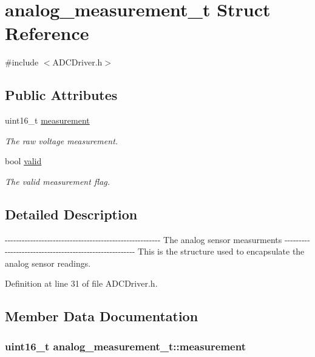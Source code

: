 \hypertarget{structanalog__measurement__t}{\section{analog\-\_\-measurement\-\_\-t \-Struct \-Reference}
\label{structanalog__measurement__t}
}


{\ttfamily \#include $<$\-A\-D\-C\-Driver.\-h$>$}

\subsection*{\-Public \-Attributes}
\begin{DoxyCompactItemize}
\item 
uint16\-\_\-t \hyperlink{structanalog__measurement__t_a57e124bc5340136bbbb95a2f37a6ce09}{measurement}
\begin{DoxyCompactList}\small\item\em \-The raw voltage measurement. \end{DoxyCompactList}\item 
bool \hyperlink{structanalog__measurement__t_ade0e3bb116d6eb88e52fc6971b7ef23e}{valid}
\begin{DoxyCompactList}\small\item\em \-The valid measurement flag. \end{DoxyCompactList}\end{DoxyCompactItemize}


\subsection{\-Detailed \-Description}
-\/-\/-\/-\/-\/-\/-\/-\/-\/-\/-\/-\/-\/-\/-\/-\/-\/-\/-\/-\/-\/-\/-\/-\/-\/-\/-\/-\/-\/-\/-\/-\/-\/-\/-\/-\/-\/-\/-\/-\/-\/-\/-\/-\/-\/-\/-\/-\/-\/-\/-\/-\/-\/-\/-\/ \-The analog sensor measurments -\/-\/-\/-\/-\/-\/-\/-\/-\/-\/-\/-\/-\/-\/-\/-\/-\/-\/-\/-\/-\/-\/-\/-\/-\/-\/-\/-\/-\/-\/-\/-\/-\/-\/-\/-\/-\/-\/-\/-\/-\/-\/-\/-\/-\/-\/-\/-\/-\/-\/-\/-\/-\/-\/-\/ \-This is the structure used to encapsulate the analog sensor readings. 

\-Definition at line 31 of file \-A\-D\-C\-Driver.\-h.



\subsection{\-Member \-Data \-Documentation}
\hypertarget{structanalog__measurement__t_a57e124bc5340136bbbb95a2f37a6ce09}{
\subsubsection[{measurement}]{\setlength{\rightskip}{0pt plus 5cm}uint16\-\_\-t {\bf analog\-\_\-measurement\-\_\-t\-::measurement}}}\label{structanalog__measurement__t_a57e124bc5340136bbbb95a2f37a6ce09}


